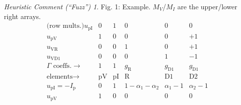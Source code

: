 \documentclass{amsproc-sunycstr}
\theoremstyle{plain}
\theoremstyle{definition}
\theoremstyle{remark}
\newtheorem{fuzz}{Heuristic Comment (``Fuzz'')}
\begin{document}
\begin{fuzz}
\noindent 
Fig. 1: Example.  
$M_V$/$M_I$ are the upper/lower right arrays.\hspace*{-20pt}
\[
\begin{array}{c|ccccc}
\mbox{(row mults.)}u_{\mbox{pI}}
                           & 0 & 1 & 0 & 0 & 0 \\
u_{\mbox{pV}}              & 1 & 0 & 0 & 0 & +1 \\
u_{\mbox{VR}}              & 0 & 0 & 1 & 0 & +1 \\
u_{\mbox{VD1}}             & 0 & 0 & 0 & 1 &-1 \\ \hline
\Gamma\mbox{\ coeffs.}\rightarrow
                           & 1 & 1 & g_{\mbox{R}}
                                       & g_{\mbox{D1}}
                                           & g_{\mbox{D1}} \\ \hline
\mbox{elements}\rightarrow & \mbox{pV}
                               & \mbox{pI}
                                   & \mbox{R} 
                                       & \mbox{D1}
                                           & \mbox{D2} \\ \hline
u_{\mbox{pI}}=-I_{\mbox{p}}& 0 & 1 
                                   & 1-\alpha_1-\alpha_2
                                       & \alpha_1-1
                                           &\alpha_2-1  \\
u_{\mbox{pV}}              & 1 & 0 & 0 & 0 & 0
\end{array}
\]

\noindent
\vspace*{0.5em}

\noindent


\end{fuzz}


%


\begin{comment} %
\begin{thebibliography}{10}

\setlength{\itemsep}{-2pt}
\end{thebibliography}
\end{comment}
\end{document}
